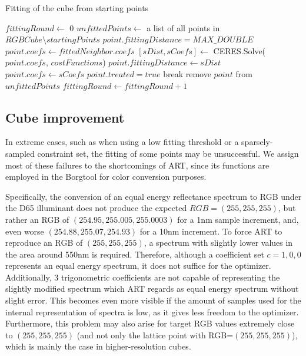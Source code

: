 \begin{algorithm}[t!]
	\caption{Fitting of the cube from starting points}
	\label{alg:upliftingAlgMoments}
	\begin{algorithmic}[1]
		\State $fittingRound \gets$ $0$
		\State $unfittedPoints \gets$ a list of all points in $RGBCube \setminus startingPoints$
		\State $point.fittingDistance = MAX\_DOUBLE$
		\EndFor
		 \label{algStep:coefficientRecomputation}
		\Else
		\State $point.coefs \gets fittedNeighbor.coefs$
		\EndIf 
		\State $[sDist,sCoefs]\gets$ CERES.Solve($point.coefs$, $costFunctions$)
		\State $point.fittingDistance \gets sDist$
		\State $point.coefs \gets sCoefs$
		\EndIf
		\State $point.treated = true$
		\State break
		\EndIf
		\EndFor
		\State remove $point$ from $unfittedPoints$
		\EndIf
		\EndFor	
		\State $fittingRound \gets fittingRound+1$
		\EndWhile
	\end{algorithmic}
\end{algorithm}

\subsection{Cube improvement} \label{ssec:cubeImprovement}

In extreme cases, such as when using a low fitting threshold or a sparsely-sampled constraint set, the fitting of some points may be unsuccessful. We assign most of these failures to the shortcomings of ART, since its functions are employed in the Borgtool for color conversion purposes.

Specifically, the conversion of an equal energy reflectance spectrum to RGB under the D65 illuminant does not produce the expected $RGB = (255, 255, 255)$, but rather an RGB of $(254.95, 255.005, 255.0003)$ for a 1nm sample increment, and, even worse $(254.88, 255.07, 254.93)$ for a 10nm increment. To force ART to reproduce an RGB of $(255, 255, 255)$, a spectrum with slightly lower values in the area around 550nm is required. Therefore, although a coefficient set $c = {1, 0, 0}$ represents an equal energy spectrum, it does not suffice for the optimizer. Additionally, 3 trigonometric coefficients are not capable of representing the slightly modified spectrum which ART regards as equal energy spectrum without slight error. This becomes even more visible if the amount of samples used for the internal representation of spectra is low, as it gives less freedom to the optimizer. Furthermore, this problem may also arise for target RGB values extremely close to $(255, 255, 255)$ (and not only the lattice point with RGB=$(255,255,255)$), which is mainly the case in higher-resolution cubes.

